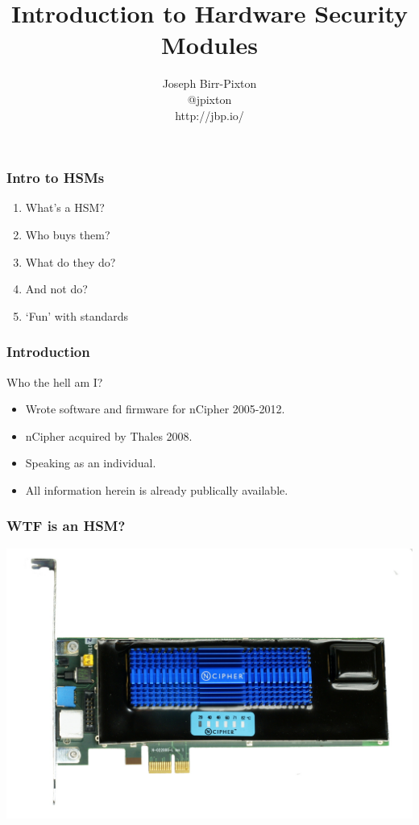\documentclass{beamer}
\title[hsms]{Introduction to Hardware Security Modules}
\author{Joseph Birr-Pixton\\
@jpixton\\
http://jbp.io/}
\date{}
\begin{document}
\frame{\titlepage}

\frame
{
  \frametitle{Intro to HSMs}

  \begin{enumerate}
    \item<1> What's a HSM?
    \item<2> Who buys them?
    \item<3> What do they do?
    \item<4> And not do?
    \item<5> `Fun' with standards
  \end{enumerate}
}

\frame
{
  \frametitle{Introduction}
  Who the hell am I?

  \begin{itemize}
    \item<1->{Wrote software and firmware for nCipher 2005-2012.}
    \item<2->{nCipher acquired by Thales 2008.}
  \end{itemize}


  \begin{itemize}
    \item<4->{Speaking as an individual.}
    \item<5->{All information herein is already publically available.}
  \end{itemize}
}

\frame
{
  \frametitle{WTF is an HSM?}

  \includegraphics[width=1.0\textwidth]{imgs/NCipher_nShield_F3_Hardware_Security_Module-sml.jpg}
}
\end{document}
